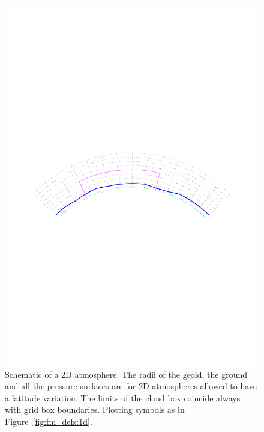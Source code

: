  \begin{figure}
  \begin{center}
   \includegraphics*[width=0.95\hsize]{Figs/atm_dim_2d}
   \caption{ Schematic of a 2D atmosphere. The radii of the geoid, the ground
     and all the pressure surfaces are for 2D atmospheres allowed to have a
     latitude variation. The limits of
     the cloud box coincide always with grid box boundaries. Plotting
     symbols as in Figure~\ref{fig:fm_defs:1d}. }
   \label{fig:fm_defs:2d}  
  \end{center}
 \end{figure}



